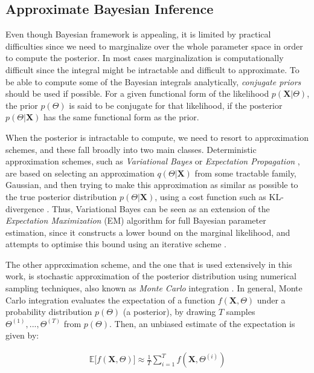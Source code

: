 \subsection{Approximate Bayesian Inference} \label{approx-bayes-infer-subsect}
Even though Bayesian framework is appealing, it is limited by practical difficulties since we need to marginalize over the whole parameter space in order to compute the posterior. In most cases marginalization is computationally difficult since the integral might be intractable and difficult to approximate. To be able to compute some of the Bayesian integrals analytically, \emph{conjugate priors} should be used if possible. For a given functional form of the likelihood $p(\mathbf{X}|\Theta)$, the prior $p(\Theta)$ is said to be conjugate for that likelihood, if the posterior $p(\Theta|\mathbf{X})$ has the same functional form as the prior.

When the posterior is intractable to compute, we need to resort to approximation schemes, and these fall broadly into two main classes. Deterministic approximation schemes, such as \emph{Variational Bayes} \citep{Beal2003} or \emph{Expectation Propagation} \citep{Minka1999}, are based on selecting an approximation $q(\Theta|\mathbf{X})$ from some tractable family, \eg Gaussian, and then trying to make this approximation as similar as possible to the true posterior distribution $p(\Theta|\mathbf{X})$, using a cost function such as KL-divergence \cite[Ch. 21]{Murphy2012}. Thus, Variational Bayes can be seen as an extension of the \emph{Expectation Maximization} (EM) algorithm for full Bayesian parameter estimation, since it constructs a lower bound on the marginal likelihood, and attempts to optimise this bound using an iterative scheme \citep{Beal2003}.

The other approximation scheme, and the one that is used extensively in this work, is stochastic approximation of the posterior distribution using numerical sampling techniques, also known as \emph{Monte Carlo} integration \citep{Robert1999, Liu2001}. In general, Monte Carlo integration evaluates the expectation of a function $f(\mathbf{X},\Theta)$ under a probability distribution $p(\Theta)$ (\eg a posterior), by drawing $T$ samples $\Theta^{(1)},...,\Theta^{(T)}$ from $p(\Theta)$. Then, an unbiased estimate of the expectation is given by:

\begin{equation} \label{mc-f-bayes}
  \begin{aligned}
	\mathbb{E}\big[ f(\mathbf{X}, \Theta)\big] \approx \frac{1}{T} \sum\limits_{i=1}^{T} f(\mathbf{X}, \Theta^{(i)})
  \end{aligned}
\end{equation}

